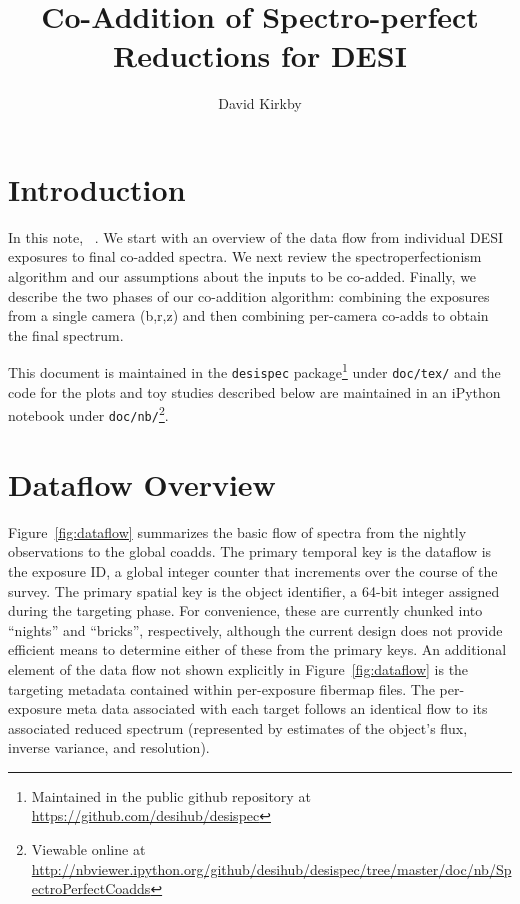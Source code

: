 \documentclass[12pt]{article}
\title{Co-Addition of Spectro-perfect\\
Reductions for DESI\\
\vspace{5mm}{\large\bf DESI-doc-1056-v2}}
\author{David Kirkby}
\providecommand{\fig}[1]{Figure~\ref{fig:#1}}
\begin{document}
\maketitle

\section{Introduction}

In this note, ~\cite{2010PASP..122..248B}. We start with an overview of the data flow from individual DESI exposures to final co-added spectra. We next review the spectroperfectionism algorithm and our assumptions about the inputs to be co-added. Finally, we describe the two phases of our co-addition algorithm: combining the exposures from a single camera (b,r,z) and then combining per-camera co-adds to obtain the final spectrum.

This document is maintained in the {\tt desispec} package\footnote{Maintained in the public github repository at \url{https://github.com/desihub/desispec}} under {\tt doc/tex/} and the code for the plots and toy studies described below are maintained in an iPython notebook under {\tt doc/nb/}\footnote{Viewable online at \url{http://nbviewer.ipython.org/github/desihub/desispec/tree/master/doc/nb/SpectroPerfectCoadds}}.

\section{Dataflow Overview}

\fig{dataflow} summarizes the basic flow of spectra from the nightly observations to the global coadds. The primary temporal key is the dataflow is the exposure ID, a global integer counter that increments over the course of the survey. The primary spatial key is the object identifier, a 64-bit integer assigned during the targeting phase. For convenience, these are currently chunked into ``nights'' and ``bricks'', respectively, although the current design does not provide efficient means to determine either of these from the primary keys. An additional element of the data flow not shown explicitly in \fig{dataflow} is the targeting metadata contained within per-exposure fibermap files. The per-exposure meta data associated with each target follows an identical flow to its associated reduced spectrum (represented by estimates of the object's flux, inverse variance, and resolution).
\end{document}
